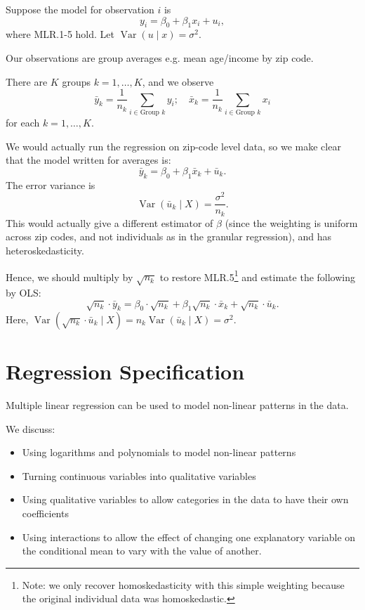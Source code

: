 \begin{example}
	Suppose the model for observation $i$ is \[
		y_i = \beta_0 + \beta_1 x_i + u_i
	,\] where MLR.1-5 hold. Let $\operatorname{Var}(u \mid x) = \sigma^2$.
	
	Our observations are group averages e.g. mean age/income by zip code.
	
	There are $K$ groups $k = 1, \ldots, K$, and we observe \[
		\bar{y}_k = \frac{1}{n_k} \sum_{i \in \text{Group } k} y_i; \quad \bar{x}_k = \frac{1}{n_k} \sum_{i \in \text{Group } k} x_i
	\] for each $k = 1, \ldots, K$.
	
	We would actually run the regression on zip-code level data, so we make clear that the model written for averages is: \[
		\bar{y}_k = \beta_0 + \beta_1 \bar{x}_k + \bar{u}_k
	.\] 
	The error variance is \[
		\operatorname{Var}(\bar{u}_k \mid X) = \frac{\sigma^2}{n_k}
	.\] 
	This would actually give a different estimator of $\beta$ (since the weighting is uniform across zip codes, and not individuals as in the granular regression), and has heteroskedasticity.

	Hence, we should multiply by $\sqrt{n_k}$ to restore MLR.5\footnote{Note: we only recover homoskedasticity with this simple weighting because the original individual data was homoskedastic.} and estimate the following by OLS: \[
		\sqrt{n_k} \cdot \bar{y}_k = \beta_0 \cdot \sqrt{n_k} + \beta_1 \sqrt{n_k} \cdot \bar{x}_k + \sqrt{n_k} \cdot \bar{u}_k
	.\] 
	Here, $\operatorname{Var}(\sqrt{n_k} \cdot \bar{u}_k \mid X) = n_k \operatorname{Var}(\bar{u}_k \mid X) = \sigma^2$.
\end{example}

\section{Regression Specification}

\begin{remark}	Multiple linear regression can be used to model non-linear patterns in the data.
	
	We discuss:
	\begin{itemize}
		\item Using logarithms and polynomials to model non-linear patterns
		\item Turning continuous variables into qualitative variables
		\item Using qualitative variables to allow categories in the data to have their own coefficients
		\item Using interactions to allow the effect of changing one explanatory variable on the conditional mean to vary with the value of another.
	\end{itemize}
\end{remark}

